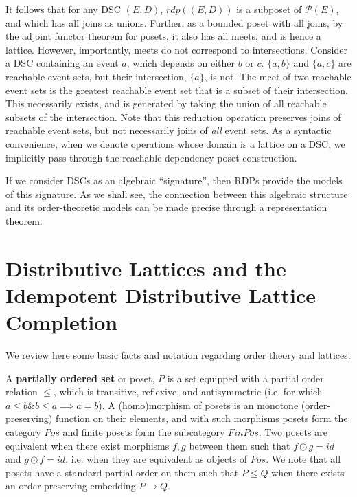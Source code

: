 \documentclass[hoptionsi,review,screen,format=acmsmall]{acmart}
\theoremstyle{definition}
\newcommand{\Pc}{\mathcal{P}}
\newcommand{\band}{\mathop{\&}}
\begin{document}
It follows that for any DSC \((E,D)\), \(rdp((E,D))\)  is a subposet of \(\Pc(E)\), and which has all joins as unions. Further, as a bounded poset with all joins, by the adjoint functor theorem for posets, it also has all  meets, and is hence a lattice. However, importantly, meets do not correspond to intersections. Consider a DSC containing an event \(a\), which depends on either \(b\) or \(c\). \(\{a,b\}\) and  \(\{a,c\}\) are reachable event sets, but their intersection, \(\{a\}\), is not. The meet of two reachable event sets is the greatest reachable event set that is a subset of their intersection. This necessarily exists, and is generated by taking the union of all reachable subsets of the intersection. Note that this reduction operation preserves joins of reachable event sets, but not necessarily joins of \textit{all} event sets. As a syntactic convenience, when we denote operations whose domain is a lattice on a DSC, we implicitly pass through the reachable dependency poset construction.

If we consider DSCs as an algebraic ``signature'', then RDPs provide the models of this signature. As we shall see, the connection between this algebraic structure and its order-theoretic models can be made precise through a representation theorem.

\section{Distributive Lattices and the Idempotent Distributive Lattice Completion}

We review here some basic facts and notation regarding order theory and lattices.

A \textbf{partially ordered set} or poset, \(P\) is a set equipped with a partial order relation \(\le\), which is transitive,  reflexive, and antisymmetric (i.e. for which \( a \le b \band b \le a \implies a = b\)). A (homo)morphism of posets is an monotone (order-preserving) function on their elements, and with such morphisms posets form the category \(Pos\) and finite posets form the subcategory \(FinPos\). Two posets are equivalent when there exist morphisms \(f, g\) between them such that \(f \odot g = id\) and \(g \odot f = id\), i.e. when they are equivalent as objects of \(Pos\). We note that all posets have a standard partial order on them such that \(P \le Q\) when there exists an order-preserving embedding \(P \rightarrow Q\).
\end{document}

